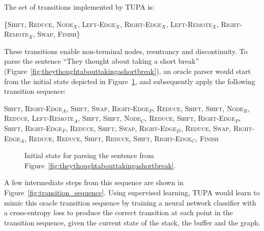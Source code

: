 \documentclass[12pt,a4paper,table]{report}
\begin{document}
The set of transitions implemented by TUPA is:

\{\textsc{Shift, Reduce, {Node$_X$}, Left-Edge$_X$, Right-Edge$_X$,}
\textsc{{Left-Remote$_X$}, {Right-Remote$_X$}, {Swap}, Finish}\}

These transitions enable {non-terminal nodes}, {reentrancy} and {discontinuity}.
To parse the sentence ``They thought about taking a short break'' (Figure~\ref{fig:theythoughtabouttakingashortbreak}),
an oracle parser would start from the initial state depicted in Figure~\ref{fig:initial_state},
and subsequently apply the following transition sequence:

\textsc{Shift}, \textsc{Right-Edge$_A$}, \textsc{Shift}, \textsc{Swap}, \textsc{Right-Edge$_P$}, \textsc{Reduce}, \textsc{Shift}, \textsc{Shift}, \textsc{Node$_R$}, \textsc{Reduce}, \textsc{Left-Remote$_A$}, \textsc{Shift}, \textsc{Shift}, \textsc{Node$_C$}, \textsc{Reduce}, \textsc{Shift}, \textsc{Right-Edge$_P$}, \textsc{Shift}, \textsc{Right-Edge$_F$}, \textsc{Reduce}, \textsc{Shift}, \textsc{Swap}, \textsc{Right-Edge$_D$}, \textsc{Reduce}, \textsc{Swap}, \textsc{Right-Edge$_A$}, \textsc{Reduce}, \textsc{Reduce}, \textsc{Shift}, \textsc{Reduce}, \textsc{Shift}, \textsc{Right-Edge$_C$}, \textsc{Finish}

\begin{figure}\centering
{}
\caption{Initial state for parsing the sentence from Figure~\ref{fig:theythoughtabouttakingashortbreak}.}
\label{fig:initial_state}
\end{figure}

A few intermediate steps from this sequence are shown in Figure~\ref{fig:transition_sequence}.
Using supervised learning, TUPA would learn to mimic this oracle transition sequence
by training a neural network classifier with a cross-entropy loss
to produce the correct transition at each point in the transition sequence,
given the current state of the stack, the buffer and the graph.
\end{document}
